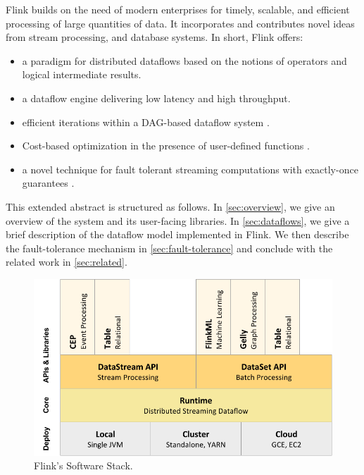 \documentclass{llncs}
\begin{document}
Flink builds on the need of modern enterprises for timely, scalable, and efficient processing of large quantities of data. It incorporates and contributes novel ideas from stream processing, and database systems. In short, Flink offers: 
 \begin{itemize}
\item a paradigm for distributed dataflows based on the notions of operators and logical intermediate results.
\item a dataflow engine delivering low latency and high throughput.
\item efficient iterations within a DAG-based dataflow system \cite{DBLP:journals/pvldb/EwenTKM12}.
\item Cost-based optimization in the presence of user-defined functions \cite{battre2010nephele,blackBoxes}.
\item a novel technique for fault tolerant streaming computations with exactly-once guarantees \cite{carbone2015lightweight}.
\end{itemize}


This extended abstract is structured as follows. In \autoref{sec:overview}, we give an overview of the system and its user-facing libraries. In \autoref{sec:dataflows}, we give a brief description of the dataflow model implemented in Flink. We then describe the fault-tolerance mechanism in \autoref{sec:fault-tolerance} and conclude with the related work in \autoref{sec:related}.


\begin{figure}[t!]
\centering
\includegraphics[width=.8\textwidth]{architecture}
\caption{Flink's Software Stack.}
\label{fig:stack}
\end{figure}
\end{document}
